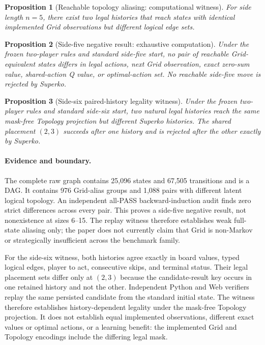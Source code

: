 \documentclass[10pt,letterpaper]{article}
\newtheorem{proposition}{Proposition}
\begin{document}
\begin{proposition}[Reachable topology aliasing: computational witness]
For side length $n=5$, there exist two legal histories that reach states with
identical implemented Grid observations but different logical edge sets.
\end{proposition}

\begin{proposition}[Side-five negative result: exhaustive computation]
Under the frozen two-player rules and standard side-five start, no pair of
reachable Grid-equivalent states differs in legal actions, next Grid
observation, exact zero-sum value, shared-action Q value, or optimal-action set.
No reachable side-five move is rejected by Superko.
\end{proposition}

\begin{proposition}[Side-six paired-history legality witness]
Under the frozen two-player rules and standard side-six start, two natural
legal histories reach the same mask-free Topology projection but different
Superko histories. The shared placement $(2,3)$ succeeds after one history and
is rejected after the other exactly by Superko.
\end{proposition}

\paragraph{Evidence and boundary.}
The complete raw graph contains 25,096 states and 67,505 transitions and is a
DAG. It contains 976 Grid-alias groups and 1,088 pairs with different latent
logical topology. An independent all-PASS backward-induction audit finds zero
strict differences across every pair. This proves a side-five negative result,
not nonexistence at sizes 6--15. The replay witness therefore establishes weak
full-state aliasing only; the paper does not currently claim that Grid is
non-Markov or strategically insufficient across the benchmark family.

For the side-six witness, both histories agree exactly in board values, typed
logical edges, player to act, consecutive skips, and terminal status. Their
legal placement sets differ only at $(2,3)$ because the candidate-result key
occurs in one retained history and not the other. Independent Python and Web
verifiers replay the same persisted candidate from the standard initial state.
The witness therefore establishes history-dependent legality under the
mask-free Topology projection. It does not establish equal implemented
observations, different exact values or optimal actions, or a learning benefit:
the implemented Grid and Topology encodings include the differing legal mask.
\end{document}
